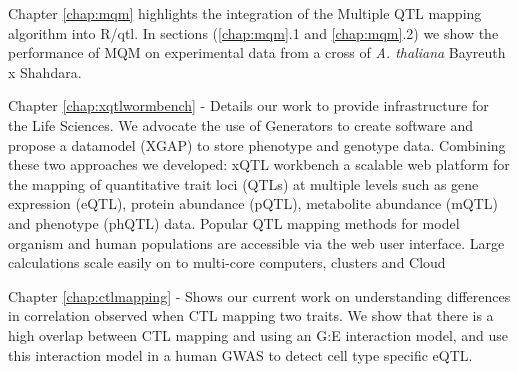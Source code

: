 Chapter \ref{chap:mqm} highlights the integration of the Multiple QTL mapping algorithm into R/qtl. In sections 
(\ref{chap:mqm}.1 and  \ref{chap:mqm}.2) we show the performance of MQM on experimental data from a cross of \emph{A. thaliana} 
Bayreuth x Shahdara.

Chapter \ref{chap:xqtlwormbench} - Details our work to provide infrastructure for the Life Sciences. We advocate the 
use of Generators to create software and propose a datamodel (XGAP) to store phenotype and 
genotype data. Combining these two approaches we developed: xQTL workbench a scalable web 
platform for the mapping of quantitative trait loci (QTLs) at multiple levels such as gene 
expression (eQTL), protein abundance (pQTL), metabolite abundance (mQTL) and phenotype (phQTL) data. 
Popular QTL mapping methods for model organism and human populations are accessible via the web 
user interface. Large calculations scale easily on to multi-core computers, clusters and Cloud

Chapter \ref{chap:ctlmapping} -  Shows our current work on understanding differences in correlation observed when 
CTL mapping two traits. We show that there is a high overlap between CTL mapping and using an 
G:E interaction model, and use this interaction model in a human GWAS to detect cell type 
specific eQTL.

